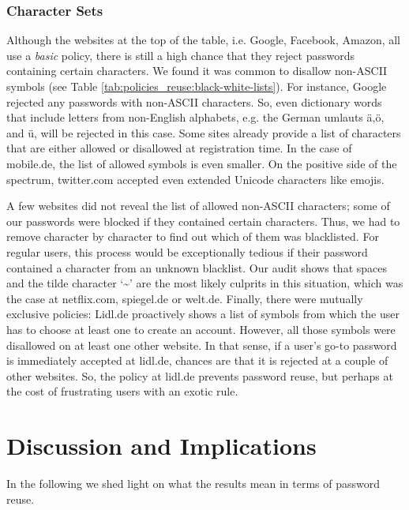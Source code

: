 \subsubsection{Character Sets}
Although the websites at the top of the table, i.e. Google, Facebook, Amazon, all use a \textit{basic} policy, there is still a high chance that they reject passwords containing certain characters. We found it was common to disallow non-ASCII symbols (see Table \ref{tab:policies_reuse:black-white-lists}). For instance, Google rejected any passwords with non-ASCII characters. So, even dictionary words that include letters from non-English alphabets, e.g. the German umlauts ä,ö, and ü, will be rejected in this case. Some sites already provide a list of characters that are either allowed or disallowed at registration time. In the case of mobile.de, the list of allowed symbols is even smaller. On the positive side of the spectrum, twitter.com accepted even extended Unicode characters like emojis. 

A few websites did not reveal the list of allowed non-ASCII characters; some of our passwords were blocked if they contained certain characters. Thus, we had to remove character by character to find out which of them was blacklisted. For regular users, this process would be exceptionally tedious if their password contained a character from an unknown blacklist. Our audit shows that spaces and the tilde character `\textasciitilde' are the most likely culprits in this situation, which was the case at netflix.com, spiegel.de or welt.de. Finally, there were mutually exclusive policies: Lidl.de proactively shows a list of symbols from which the user has to choose at least one to create an account. However, all those symbols were disallowed on at least one other website. In that sense, if a user's go-to password is immediately accepted at lidl.de, chances are that it is rejected at a couple of other websites. So, the policy at lidl.de prevents password reuse, but perhaps at the cost of frustrating users with an exotic rule. 



\section{Discussion and Implications}
In the following we shed light on what the results mean in terms of password reuse. 
